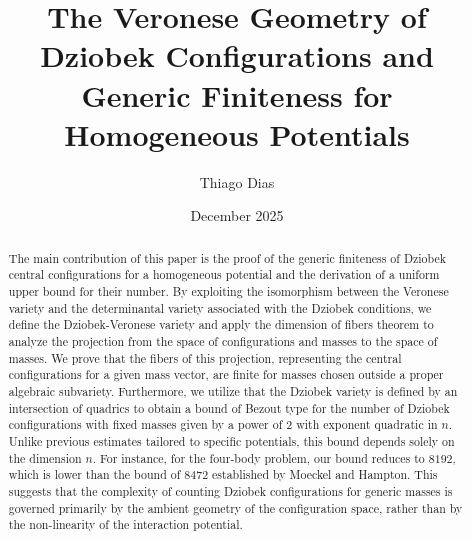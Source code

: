 \documentclass{amsart}
\theoremstyle{definition}
\theoremstyle{remark}
\numberwithin{equation}{section}
\begin{document}


\title[]{The Veronese Geometry of Dziobek Configurations and Generic Finiteness for Homogeneous Potentials}
\author[Dias]{Thiago Dias}

\address{Departamento de Matemática, Universidade Federal Rural de Pernambuco - Rua Dom Manuel de Medeiros s/n, 52171-900, Recife, Pernambuco, Brasil}





\date{December 2025}

\dedicatory{}


\begin{abstract}

The main contribution of this paper is the proof of the generic finiteness of Dziobek central configurations for a homogeneous potential and the derivation of a uniform upper bound for their number. By exploiting the isomorphism between the Veronese variety and the determinantal variety associated with the Dziobek conditions, we define the Dziobek-Veronese variety and apply the dimension of fibers theorem to analyze the projection from the space of configurations and masses to the space of masses. We prove that the fibers of this projection, representing the central configurations for a given mass vector, are finite for masses chosen outside a proper algebraic subvariety. Furthermore, we utilize that the Dziobek variety is defined by an intersection of quadrics to obtain a bound of Bezout type for the number of Dziobek configurations with fixed masses given by a power of $2$ with exponent quadratic in $n$. Unlike previous estimates tailored to specific potentials, this bound depends solely on the dimension $n$. For instance, for the four-body problem, our bound reduces to $8192$, which is lower than the bound of $8472$ established by Moeckel and Hampton. This suggests that the complexity of counting Dziobek configurations for generic masses is governed primarily by the ambient geometry of the configuration space, rather than by the non-linearity of the interaction potential.
\end{abstract}
\end{document}
